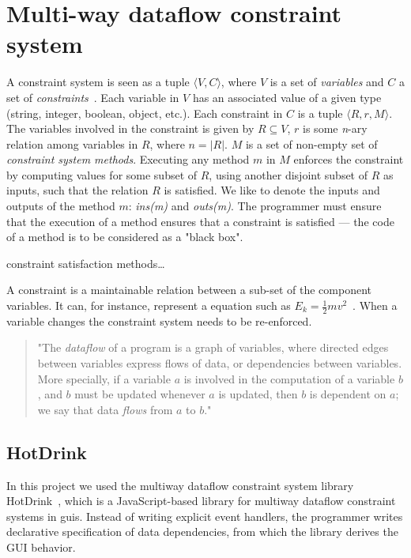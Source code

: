 \chapter{Multi-way dataflow constraint system}
\label{chap:constraint-systems}

A constraint system is seen as a tuple ${\langle V, C \rangle}$, where $V$ is a set of \textit{variables} and $C$ a set of \textit{constraints}~\cite{jarvi_algorithms_2009}. Each variable in $V$ has an associated value of a given type (string, integer, boolean, object, etc.). Each constraint in $C$ is a tuple ${\langle R, r, M \rangle}$. The variables involved in the constraint is given by ${R \subseteq V}$, $r$ is some \textit{n}-ary relation among variables in $R$, where ${n = \lvert R \rvert}$. $M$ is a set of non-empty set of \textit{constraint system methods}. Executing any method $m$ in $M$ enforces the constraint by computing values for some subset of $R$, using another disjoint subset of $R$ as inputs, such that the relation $R$ is satisfied. We like to denote the inputs and outputs of the method $m$: \textit{ins(m)} and \textit{outs(m)}. The programmer must ensure that the execution of a method ensures that a constraint is satisfied --- the code of a method is to be considered as a "black box". 

constraint satisfaction methods…

A constraint is a maintainable relation between a sub-set of the component variables. It can, for instance, represent a equation such as  $E_k = \frac{1}{2}mv^2$~\cite{svartveit2021multithreaded}. When a variable changes the constraint system needs to be re-enforced.

\begin{quote}
    "The \textit{dataflow} of a program is a graph of variables, where directed edges between variables express flows of data, or dependencies between variables. More specially, if a variable $a$ is involved in the computation of a variable $b$, and $b$ must be updated whenever $a$ is updated, then $b$ is dependent on $a$; we say that data \textit{flows} from $a$ to $b$."~\cite{stokke2020declaratively}
\end{quote}

\section{HotDrink}
\label{sec:hotdrink}

In this project we used the multiway dataflow constraint system library 
HotDrink~\cite{HotDrink}, which is a JavaScript-based library for multiway dataflow constraint systems in \gls{gui}s. Instead of writing explicit event handlers, the programmer writes declarative specification of data dependencies, from which the library derives the GUI behavior.

